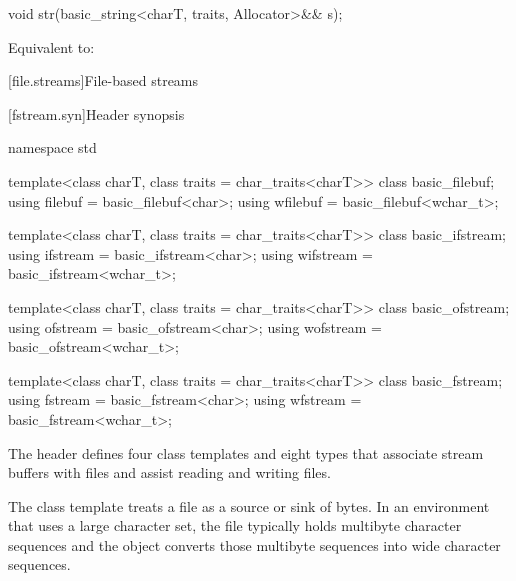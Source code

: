 %
\begin{itemdecl}
void str(basic_string<charT, traits, Allocator>&& s);
\end{itemdecl}

\begin{itemdescr}
\pnum
\effects
Equivalent to: 
\end{itemdescr}

[file.streams]{File-based streams}

[fstream.syn]{Header  synopsis}

%
%
%
%
%
%
%
%
%
%
%
%
%
%
%
%
%
\begin{codeblock}
namespace std {
  template<class charT, class traits = char_traits<charT>>
    class basic_filebuf;
  using filebuf  = basic_filebuf<char>;
  using wfilebuf = basic_filebuf<wchar_t>;

  template<class charT, class traits = char_traits<charT>>
    class basic_ifstream;
  using ifstream  = basic_ifstream<char>;
  using wifstream = basic_ifstream<wchar_t>;

  template<class charT, class traits = char_traits<charT>>
    class basic_ofstream;
  using ofstream  = basic_ofstream<char>;
  using wofstream = basic_ofstream<wchar_t>;

  template<class charT, class traits = char_traits<charT>>
    class basic_fstream;
  using fstream  = basic_fstream<char>;
  using wfstream = basic_fstream<wchar_t>;
}
\end{codeblock}

\pnum
The header 
defines four class templates and eight types
that associate stream buffers with files and assist
reading and writing files.

\pnum
\begin{note}
The class template  treats a file as a source or
sink of bytes. In an environment that uses a large character set, the file
typically holds multibyte character sequences and the 
object converts those multibyte sequences into wide character sequences.
\end{note}

